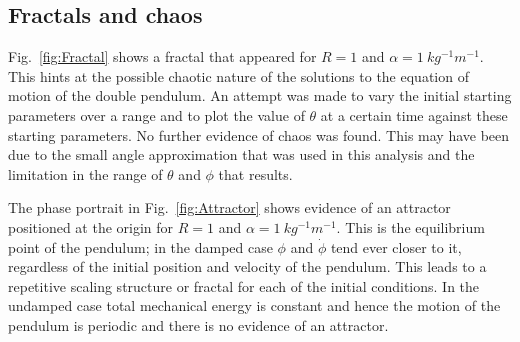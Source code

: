 \documentclass[10pt,a4paper]{article}
\begin{document}
\subsection{Fractals and chaos}
Fig.~\ref{fig:Fractal} shows a fractal that appeared for  $R=1$ and $\alpha=1\:kg^{-1}m^{-1}$. This hints at the possible chaotic nature of the solutions to the equation of motion of the double pendulum. An attempt was made to vary the initial starting parameters over a range and to plot the value of $\theta$ at a certain time against these starting parameters. No further evidence of chaos was found. This may have been due to the small angle approximation that was used in this analysis and the limitation in the range of $\theta$ and $\phi$ that results. 

The phase portrait in Fig.~\ref{fig:Attractor} shows evidence of an attractor positioned at the origin for $R=1$ and $\alpha=1\:kg^{-1}m^{-1}$. This is the equilibrium point of the pendulum; in the damped case $\phi$ and $\dot{\phi}$ tend ever closer to it, regardless of the initial position and velocity of the pendulum. This leads to a repetitive scaling structure or fractal for each of the initial conditions. In the undamped case total mechanical energy is constant and hence the motion of the pendulum is periodic and there is no evidence of an attractor.
\end{document}
